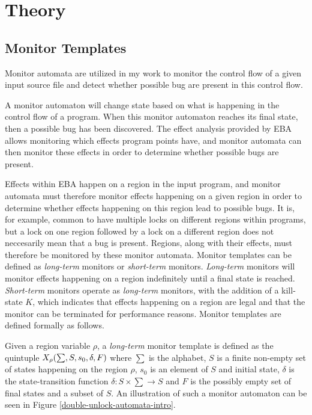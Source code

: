 \section{Theory}


\subsection{Monitor Templates}
\noindent Monitor automata are utilized in my work to monitor the control flow of a given input source file and detect whether possible bug are present in this control flow. 

\newpar A monitor automaton will change state based on what is happening in the control flow of a program. When this monitor automaton reaches its final state, then a possible bug has been discovered. The effect analysis provided by EBA allows monitoring which effects program points have, and monitor automata can then monitor these effects in order to determine whether possible bugs are present. 

\newpar Effects within EBA happen on a region in the input program, and monitor automata must therefore monitor effects happening on a given region in order to determine whether effects happening on this region lead to possible bugs. It is, for example, common to have multiple locks on different regions within programs, but a lock on one region followed by a lock on a different region does not neccesarily mean that a bug is present. Regions, along with their effects, must therefore be monitored by these monitor automata. Monitor templates can be defined as \textit{long-term} monitors or \textit{short-term} monitors. \textit{Long-term} monitors will monitor effects happening on a region indefinitely until a final state is reached. \textit{Short-term} monitors operate as \textit{long-term} monitors, with the addition of a kill-state $K$, which indicates that effects happening on a region are legal and that the monitor can be terminated for performance reasons. Monitor templates are defined formally as follows. 


\newpar Given a region variable $\rho$, a \textit{long-term} monitor template is defined as the quintuple $X_\rho (\sum, S, s_0, \delta, \\F)$ where $\sum$ is the alphabet, $S$ is a finite non-empty set of states happening on the region $\rho$, $s_0$ is an element of $S$ and initial state, $\delta$ is the state-transition function $\delta: S \times \sum \rightarrow S$ and $F$ is the possibly empty set of final states and a subset of $S$. An illustration of such a monitor automaton can be seen in Figure \ref{double-unlock-automata-intro}. 

